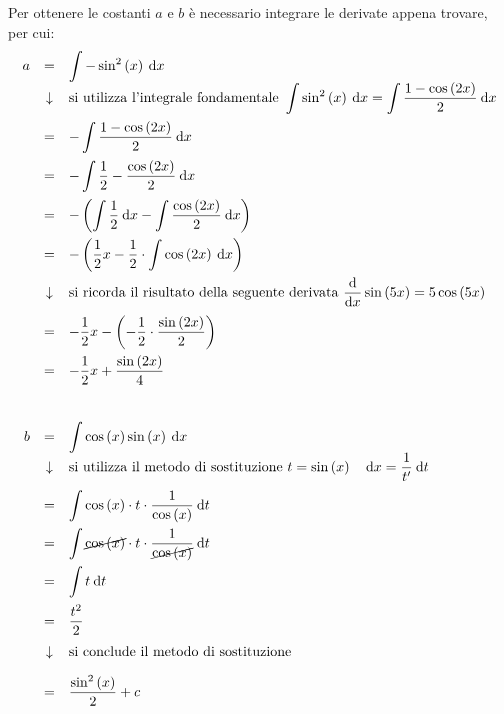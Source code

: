 \documentclass[a4paper]{article}
\begin{document}
	\noindent
	Per ottenere le costanti $a$ e $b$ è necessario integrare le derivate appena trovare, per cui:
	\begin{equation*}
		\begin{array}{rcl}
			a &=& \displaystyle\int -\sin^{2}\left(x\right) \:\mathrm{d}x \\
			&\downarrow& \text{si utilizza l'integrale fondamentale } \displaystyle\int \sin^{2}\left(x\right) \: \mathrm{d}x = \int\dfrac{1-\cos\left(2x\right)}{2} \: \mathrm{d}x \\ [1em]
			&=& - \displaystyle\int \dfrac{1-\cos\left(2x\right)}{2} \:\mathrm{d}x \\ [1em]
			&=& -\displaystyle\int \dfrac{1}{2} - \dfrac{\cos\left(2x\right)}{2} \:\mathrm{d}x \\ [1em]
			&=& \displaystyle -\left( \int\dfrac{1}{2} \:\mathrm{d}x - \int \dfrac{\cos\left(2x\right)}{2} \:\mathrm{d}x \right) \\ [1em]
			&=& \displaystyle -\left( \dfrac{1}{2}x - \dfrac{1}{2}\cdot\int\cos\left(2x\right) \:\mathrm{d}x \right) \\ [1em]
			&\downarrow& \text{si ricorda il risultato della seguente derivata } \dfrac{\mathrm{d}}{\mathrm{d} x} \sin\left(5x\right) = 5\cos\left(5x\right) \\ [1em]
			&=& -\dfrac{1}{2}x -\left(-\dfrac{1}{2} \cdot \dfrac{\sin\left(2x\right)}{2}\right) \\ [1em]
			&=& -\dfrac{1}{2}x + \dfrac{\sin\left(2x\right)}{4} \\ [3em]
			b &=& \displaystyle\int \cos\left(x\right)\sin\left(x\right) \: \mathrm{d}x \\
			&\downarrow& \text{si utilizza il metodo di sostituzione } t = \sin\left(x\right) \hspace{1em} \mathrm{d}x = \dfrac{1}{t'} \: \mathrm{d}t \\ [1em]
			&=& \displaystyle\int \cos\left(x\right) \cdot t \cdot \dfrac{1}{\cos\left(x\right)} \: \mathrm{d}t \\ [1em]
			&=& \displaystyle\int \cancel{\cos\left(x\right)} \cdot t \cdot \dfrac{1}{\cancel{\cos\left(x\right)}} \: \mathrm{d}t \\ [1em]
			&=& \displaystyle\int t \: \mathrm{d}t \\ [1em]
			&=& \dfrac{t^{2}}{2} \\ [1em]
			&\downarrow& \text{si conclude il metodo di sostituzione} \\ [1em]
			&=& \dfrac{\sin^{2}\left(x\right)}{2} + c
		\end{array}
	\end{equation*}
\end{document}

